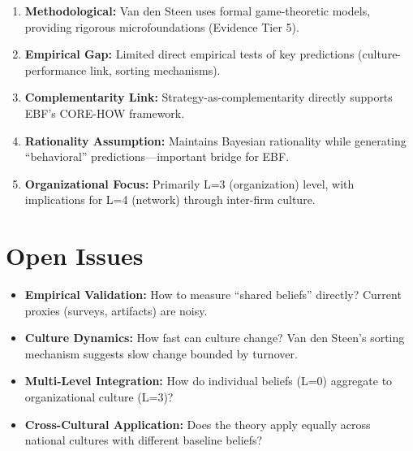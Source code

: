 \begin{enumerate}
    \item \textbf{Methodological:} Van den Steen uses formal game-theoretic
    models, providing rigorous microfoundations (Evidence Tier 5).

    \item \textbf{Empirical Gap:} Limited direct empirical tests of key
    predictions (culture-performance link, sorting mechanisms).

    \item \textbf{Complementarity Link:} Strategy-as-complementarity directly
    supports EBF's CORE-HOW framework.

    \item \textbf{Rationality Assumption:} Maintains Bayesian rationality while
    generating ``behavioral'' predictions---important bridge for EBF.

    \item \textbf{Organizational Focus:} Primarily L=3 (organization) level,
    with implications for L=4 (network) through inter-firm culture.
\end{enumerate}

\section{Open Issues}

\begin{itemize}
    \item \textbf{Empirical Validation:} How to measure ``shared beliefs''
    directly? Current proxies (surveys, artifacts) are noisy.

    \item \textbf{Culture Dynamics:} How fast can culture change? Van den Steen's
    sorting mechanism suggests slow change bounded by turnover.

    \item \textbf{Multi-Level Integration:} How do individual beliefs (L=0)
    aggregate to organizational culture (L=3)?

    \item \textbf{Cross-Cultural Application:} Does the theory apply equally
    across national cultures with different baseline beliefs?
\end{itemize}

